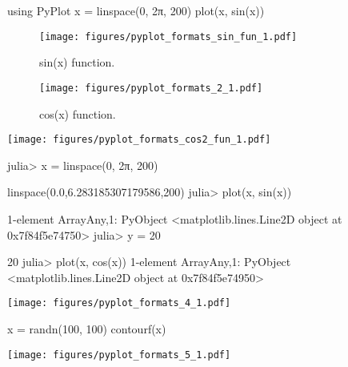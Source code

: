 




\begin{juliacode}
using PyPlot
x = linspace(0, 2π, 200)
plot(x, sin(x))
\end{juliacode}
\begin{figure}[ht]
\center
\texttt{[image: figures/pyplot\_formats\_sin\_fun\_1.pdf]}
\caption{sin(x) function.}
\label{fig:sin_fun}
\end{figure}



\begin{figure}[htpb]
\center
\texttt{[image: figures/pyplot\_formats\_2\_1.pdf]}
\caption{cos(x) function.}
\end{figure}



\texttt{[image: figures/pyplot\_formats\_cos2\_fun\_1.pdf]}



\begin{juliaterm}
julia> x = linspace(0, 2π, 200)

linspace(0.0,6.283185307179586,200)
julia> plot(x, sin(x))

1-element Array{Any,1}:
 PyObject <matplotlib.lines.Line2D object at 0x7f84f5e74750>
julia> y = 20

20
julia> plot(x, cos(x))
1-element Array{Any,1}:
 PyObject <matplotlib.lines.Line2D object at 0x7f84f5e74950>
\end{juliaterm}
\texttt{[image: figures/pyplot\_formats\_4\_1.pdf]}



\begin{juliacode}
x = randn(100, 100)
contourf(x)
\end{juliacode}
\texttt{[image: figures/pyplot\_formats\_5\_1.pdf]}
